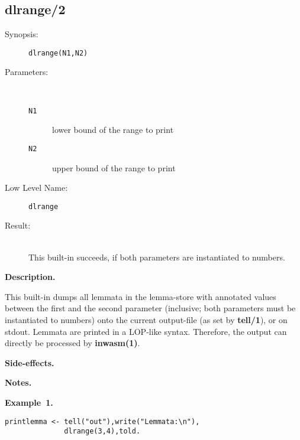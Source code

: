 %
%
%
\subsection{ dlrange/2}

\begin{description}
\item[Synopsis:]
	{\tt dlrange(N1,N2)}
\item[Parameters:]\ \\[-0.5cm]
	\begin{description}
	\item[{\tt N1}]
lower bound of the range to print
	\item[{\tt N2}]
upper bound of the range to print
	\end{description}
\item[Low Level Name:]
	{\tt dlrange}
\item[Result:]\ \\
This built-in succeeds, if both parameters are
instantiated to numbers.

\end{description}

\vspace*{0.5cm}
\noindent
{\bf Description.}

 
This built-in dumps all lemmata in the lemma-store
with annotated values between the first and the second parameter
(inclusive; both parameters must be instantiated to numbers)
onto the current output-file (as set by {\bf tell/1}), or on
stdout.
Lemmata are printed in a LOP-like syntax. Therefore, the output can directly
be processed by {\bf inwasm(1)}.
 
\vspace*{0.5cm}
\noindent
{\bf Side-effects.}

\vspace*{0.5cm}
\noindent
{\bf Notes.}

\vspace*{0.5cm}
\noindent
{\bf Example~1.}
\begin{verbatim}
printlemma <- tell("out"),write("Lemmata:\n"),
              dlrange(3,4),told.
\end{verbatim}


